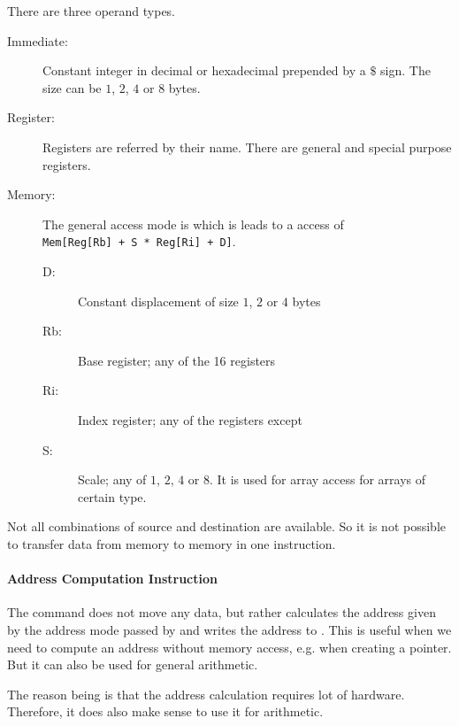 There are three operand types.
\begin{description}
    \item[Immediate:] Constant integer in decimal or hexadecimal prepended by a $\$$ sign. The size can be $1$, $2$, $4$ or $8$ bytes.
    \item[Register:] Registers are referred by their name. There are general and special purpose registers.
    \item[Memory:] The general access mode is  which is leads to a access of\\
        \verb_Mem[Reg[Rb] + S * Reg[Ri] + D]_.
        \begin{description}
            \item[D:] Constant displacement of size $1$, $2$ or $4$ bytes
            \item[Rb:] Base register; any of the 16 registers
            \item[Ri:] Index register; any of the registers except 
            \item[S:] Scale; any of $1$, $2$, $4$ or $8$. It is used for array access for arrays of certain type.
        \end{description}
\end{description}

Not all combinations of source and destination are available. So it is not possible to transfer data from memory to memory in one instruction.

\paragraph{Address Computation Instruction}
The command  does not move any data, but rather calculates the address given by the address mode passed by  and writes the address to . This is useful when we need to compute an address without memory access, e.g. when creating a pointer. But it can also be used for general arithmetic.

The reason being is that the address calculation requires lot of hardware. Therefore, it does also make sense to use it for arithmetic.

